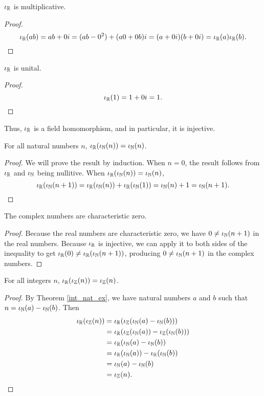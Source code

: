 \documentclass[../../math.tex]{subfiles}
\begin{document}
\begin{instance}
    $\iota_{\mathbb{R}}$ is multiplicative.
\end{instance}
\begin{proof}
    \[
        \iota_{\mathbb{R}}(ab)
        = ab + 0i
        = (ab - 0^2) + (a0 + 0b)i
        = (a + 0i)(b + 0i)
        = \iota_{\mathbb{R}}(a) \iota_{\mathbb{R}}(b).
    \]
\end{proof}

\begin{instance}
    $\iota_{\mathbb{R}}$ is unital.
\end{instance}
\begin{proof}
    \[
        \iota_{\mathbb{R}}(1) = 1 + 0i = 1.
    \]
\end{proof}

Thus, $\iota_{\mathbb{R}}$ is a field homomorphism, and in particular, it is injective.

\begin{theorem}
    For all natural numbers $n$, $\iota_{\mathbb{R}}(\iota_{\mathbb{N}}(n)) = \iota_{\mathbb{N}}(n)$.
\end{theorem}
\begin{proof}
    We will prove the result by induction.  When $n = 0$, the result follows
    from $\iota_{\mathbb{R}}$ and $\iota_{\mathbb{N}}$ being nullitive.  When $\iota_{\mathbb{R}}(\iota_{\mathbb{N}}(n)) = \iota_{\mathbb{N}}(n)$,
    \[
        \iota_{\mathbb{R}}(\iota_{\mathbb{N}}(n + 1)) = \iota_{\mathbb{R}}(\iota_{\mathbb{N}}(n)) + \iota_{\mathbb{R}}(\iota_{\mathbb{N}}(1)) = \iota_{\mathbb{N}}(n) + 1 = \iota_{\mathbb{N}}(n + 1).
    \]
\end{proof}

\begin{instance}
    The complex numbers are characteristic zero.
\end{instance}
\begin{proof}
    Because the real numbers are characteristic zero, we have $0 \neq \iota_{\mathbb{N}}(n+1)$
    in the real numbers.  Because $\iota_{\mathbb{R}}$ is injective, we can apply it to both
    sides of the inequality to get $\iota_{\mathbb{R}}(0) \neq \iota_{\mathbb{R}}(\iota_{\mathbb{N}}(n + 1))$, producing $0
    \neq \iota_{\mathbb{N}}(n + 1)$ in the complex numbers.
\end{proof}

\begin{theorem}
    For all integers $n$, $\iota_{\mathbb{R}}(\iota_{\mathbb{Z}}(n)) = \iota_{\mathbb{Z}}(n)$.
\end{theorem}
\begin{proof}
    By Theorem \ref{int_nat_ex}, we have natural numbers $a$ and $b$ such that
    $n = \iota_{\mathbb{N}}(a) - \iota_{\mathbb{N}}(b)$.  Then
    \begin{align*}
        \iota_{\mathbb{R}}(\iota_{\mathbb{Z}}(n))
        &= \iota_{\mathbb{R}}(\iota_{\mathbb{Z}}(\iota_{\mathbb{N}}(a) - \iota_{\mathbb{N}}(b))) \\
        &= \iota_{\mathbb{R}}(\iota_{\mathbb{Z}}(\iota_{\mathbb{N}}(a)) - \iota_{\mathbb{Z}}(\iota_{\mathbb{N}}(b))) \\
        &= \iota_{\mathbb{R}}(\iota_{\mathbb{N}}(a) - \iota_{\mathbb{N}}(b)) \\
        &= \iota_{\mathbb{R}}(\iota_{\mathbb{N}}(a)) - \iota_{\mathbb{R}}(\iota_{\mathbb{N}}(b)) \\
        &= \iota_{\mathbb{N}}(a) - \iota_{\mathbb{N}}(b) \\
        &= \iota_{\mathbb{Z}}(n).
    \end{align*}
\end{proof}
\end{document}
